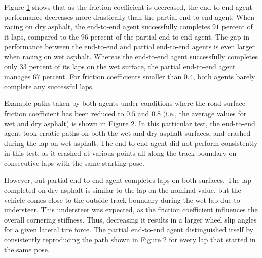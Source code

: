\begin{figure}[htb!]
    \centering
    
    \caption[]{}
    \label{fig:mu}
\end{figure}

Figure \ref{fig:mu} shows that as the friction coefficient is decreased, the end-to-end agent performance decreases more drastically than the partial-end-to-end agent.
When racing on dry asphalt, the end-to-end agent successfully completes $91$ percent of it laps, compared to the $96$ percent of the partial end-to-end agent.
The gap in performance between the end-to-end and partial end-to-end agents is even larger when racing on wet asphalt.
Whereas the end-to-end agent successfully completes only $33$ percent of its laps on the wet surface, the partial end-to-end agent manages $67$ percent.
For friction coefficients smaller than $0.4$, both agents barely complete any successful laps.

Example paths taken by both agents under conditions where the road surface friction coefficient has been reduced to $0.5$ and $0.8$ (i.e., the average values for wet and dry asphalt) is shown in Figure \ref{fig:mu_wet_gravel_path}.
In this particular test, the end-to-end agent took erratic paths on both the wet and dry asphalt surfaces, and crashed during the lap on wet asphalt.
The end-to-end agent did not perform consistently in this test, as it crashed at various points all along the track boundary on consecutive laps with the same starting pose.

However, out partial end-to-end agent completes laps on both surfaces.
The lap completed on dry asphalt is similar to the lap on the nominal value, but the vehicle comes close to the outside track boundary during the wet lap due to understeer.
This understeer was expected, as the friction coefficient influences the overall cornering stiffness.
Thus, decreasing it results in a larger wheel slip angles for a given lateral tire force.
The partial end-to-end agent distinguished itself by consistently reproducing the path shown in Figure \ref{fig:mu_wet_gravel_path} for every lap that started in the same pose.

%     

\begin{figure}[htb!]
    \centering
    
    \caption[]{}
    \label{fig:mu_wet_gravel_path}
\end{figure}


